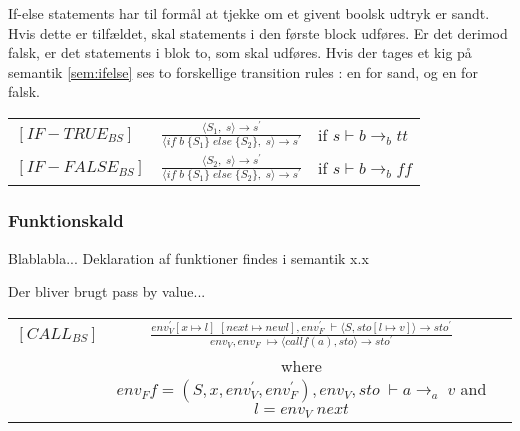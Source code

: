 If-else statements har til formål at tjekke om et givent boolsk udtryk er sandt. Hvis dette er tilfældet, skal statements i den første block udføres. Er det derimod falsk, er det statements i blok to, som skal udføres. Hvis der tages et kig på semantik \ref{sem:ifelse} ses to forskellige transition rules : en for sand, og en for falsk. 



\begin{semantik}
    \bgroup
    \def\arraystretch{3}
    \begin{table}[H]
    \centering
    \begin{tabular}{l c l}
        
        $[IF-TRUE_{BS}]$ & $
        \frac{\langle S_1,\;s\rangle  \rightarrow s^\prime}
        {\langle if\;b\;\{S_1\}\;else\;\{S_2\},\;s\rangle  \rightarrow s^\prime}
        $ & if $s \vdash b \rightarrow_b tt$ \\
        
        $[IF-FALSE_{BS}]$ & $
        \frac{\langle S_2,\;s\rangle  \rightarrow s^\prime}
        {\langle if\;b\;\{S_1\}\;else\;\{S_2\},\;s\rangle  \rightarrow s^\prime}
        $ & if $s \vdash b \rightarrow_b ff$ \\
        
    \end{tabular}
    \end{table}
    \egroup
    \caption{If-else statement}
    \label{sem:ifelse}
\end{semantik}
    
\noindent \subsubsection{Funktionskald}

Blablabla... Deklaration af funktioner findes i semantik x.x 

Der bliver brugt pass by value...



\begin{semantik}
    \bgroup
    \def\arraystretch{1.5}
    \begin{table}[H]
    \centering
    \begin{tabular}{l c l}
        
        $[CALL_{BS}]$ & 
        $ \frac
        {
            env_V^\prime [x \mapsto l]\;[next \mapsto new l], env_F^\prime\;\vdash \langle S, sto[l \mapsto v] \rangle \rightarrow sto^\prime
        }
        {
            env_V, env_F\;\mapsto \langle call f(a), sto \rangle \rightarrow sto^\prime
        } $ & \\
        
        & where $ env_F f = (S, x, env_V^\prime, env_F^\prime), env_V, sto\;\vdash a \rightarrow_a\;v$ and $l = env_V\;next $&
        
    \end{tabular}
    \end{table}
    \egroup
    \caption{Funktionskald}
    \label{sem:funktionskald}
\end{semantik}

